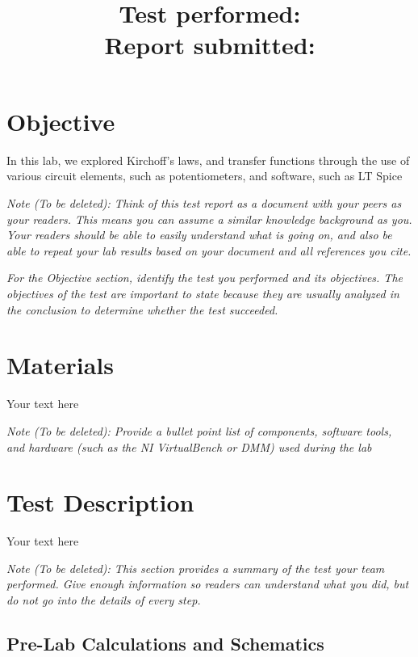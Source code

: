 \documentclass[10pt]{article}
\title{
    \textbf{\courseTitle} \\
    \textbf{\documentTitle} \\
    \bigskip
    \textbf{\large{Test performed: \testDate}} \\
    \textbf{\large{Report submitted: \reportDate}} \\
    \bigskip
    \bigskip
}
\author{\documentAuthor}
\date{}
\begin{document}
\maketitle

\newpage

\section{Objective}

In this lab, we explored Kirchoff's laws, and transfer functions through the use of various circuit elements, such as potentiometers, and software, such as LT Spice

\medskip

\textit{Note (To be deleted): Think of this test report as a document with your peers as your readers. This means you can assume a similar knowledge background as you. Your readers should be able to easily understand what is going on, and also be able to repeat your lab results based on your document and all references you cite.}

\textit{For the Objective section, identify the test you performed and its objectives. The objectives of the test are important to state because they are usually analyzed in the conclusion to determine whether the test succeeded.}

\section{Materials}

Your text here

\medskip

\textit{Note (To be deleted): Provide a bullet point list of components, software tools, and hardware (such as the NI VirtualBench or DMM) used during the lab}

\section{Test Description}

Your text here

\medskip

\textit{Note (To be deleted): This section provides a summary of the test your team performed. Give enough information so readers can understand what you did, but do not go into the details of every step.}

\subsection{Pre-Lab Calculations and Schematics}
\end{document}
